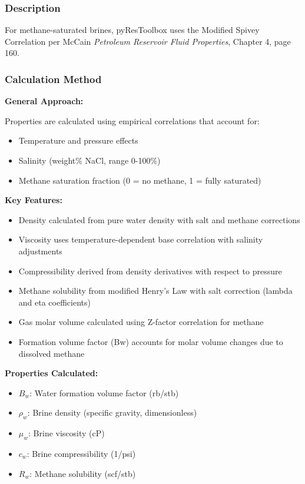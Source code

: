\documentclass[11pt,a4paper]{article}
\newcommand{\symitem}[2]{\item \textbf{#1}: #2}
\begin{document}
\subsubsection{Description}
For methane-saturated brines, pyResToolbox uses the Modified Spivey Correlation per McCain \textit{Petroleum Reservoir Fluid Properties}, Chapter 4, page 160.

\subsubsection{Calculation Method}

\begin{tcolorbox}[colback=formulabox,colframe=black!75]
\textbf{General Approach:}

Properties are calculated using empirical correlations that account for:
\begin{itemize}
\item Temperature and pressure effects
\item Salinity (weight\% NaCl, range 0-100\%)
\item Methane saturation fraction (0 = no methane, 1 = fully saturated)
\end{itemize}

\textbf{Key Features:}
\begin{itemize}
\item Density calculated from pure water density with salt and methane corrections
\item Viscosity uses temperature-dependent base correlation with salinity adjustments
\item Compressibility derived from density derivatives with respect to pressure
\item Methane solubility from modified Henry's Law with salt correction (lambda and eta coefficients)
\item Gas molar volume calculated using Z-factor correlation for methane
\item Formation volume factor (Bw) accounts for molar volume changes due to dissolved methane
\end{itemize}
\end{tcolorbox}

\textbf{Properties Calculated:}
\begin{itemize}[leftmargin=2cm]
\symitem{$B_w$}{Water formation volume factor (rb/stb)}
\symitem{$\rho_w$}{Brine density (specific gravity, dimensionless)}
\symitem{$\mu_w$}{Brine viscosity (cP)}
\symitem{$c_w$}{Brine compressibility (1/psi)}
\symitem{$R_w$}{Methane solubility (scf/stb)}
\end{itemize}
\end{document}
